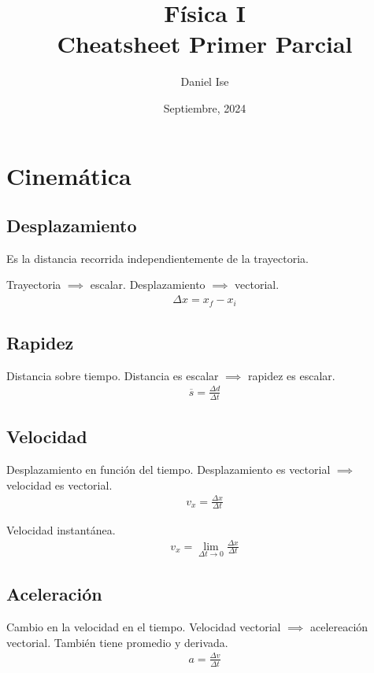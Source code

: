 \documentclass[12pt]{article}
\title{Física I\\Cheatsheet Primer Parcial}
\author{Daniel Ise}
\date{Septiembre, 2024}
\begin{document}
\maketitle

\tableofcontents

\pagebreak

\section{Cinemática}

\subsection{Desplazamiento}

Es la distancia recorrida independientemente de la trayectoria.

Trayectoria \(\implies\) escalar.
Desplazamiento \(\implies\) vectorial.
\begin{align*}
  \Delta x = x_{f} - x_{i}
\end{align*}

\subsection{Rapidez}

Distancia sobre tiempo. Distancia es escalar \(\implies\) rapidez es escalar.
\begin{align*}
  \overline{s} = \frac{\Delta d}{\Delta t}
\end{align*}

\subsection{Velocidad}

Desplazamiento en función del tiempo. Desplazamiento es vectorial \(\implies\) velocidad es vectorial.
\begin{align*}
  v_{x} = \frac{\Delta x}{\Delta t}
\end{align*}

Velocidad instantánea.
\begin{align*}
  v_{x} = \lim_{\Delta t \to 0} \frac{\Delta x}{\Delta t}
\end{align*}

\subsection{Aceleración}

Cambio en la velocidad en el tiempo. Velocidad vectorial \(\implies\) acelereación vectorial.
También tiene promedio y derivada.
\begin{align*}
  a = \frac{\Delta v}{\Delta t}
\end{align*}
\end{document}

